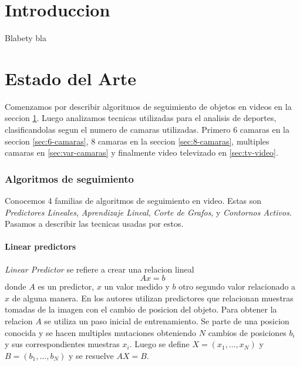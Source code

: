\documentclass[a4paper,10pt]{article}
\title{}
\date{20 de Septiembre de 2013}
\author{Civile, Juan Pablo \and Crespo, Álvaro \and Ordano, Esteban }
\begin{document}
\pagestyle{fancy}
\maketitle
\thispagestyle{fancy}

\begin{customabstract}
\textbf{
}
\end{customabstract}

\begin{keywords}
\end{keywords}

\newpage

\part*{Introduccion}

Blabety bla

\newpage

\part*{Estado del Arte}

Comenzamos por describir algoritmos de seguimiento de objetos en videos en la seccion \ref{sec:tracking}.
Luego analizamos tecnicas utilizadas para el analisis de deportes, clasificandolas segun el numero de camaras utilizadas.
Primero 6 camaras en la seccion \ref{sec:6-camaras}, 8 camaras en la seccion \ref{sec:8-camaras}, multiples camaras en \ref{sec:var-camaras} y finalmente video televizado en \ref{sec:tv-video}.

\section{Algoritmos de seguimiento}
\label{sec:tracking}

Conocemos 4 familias de algoritmos de seguimiento en video.
Estas son \textit{Predictores Lineales}, \textit{Aprendizaje Lineal}, \textit{Corte de Grafos}, y \textit{Contornos Activos}.
Pasamos a describir las tecnicas usadas por estos.

\subsection{Linear predictors}

\textit{Linear Predictor} se refiere a crear una relacion lineal \[ Ax = b \] donde $A$ es un predictor, $x$ un valor medido y $b$ otro segundo valor relacionado a $x$ de alguna manera.
En \cite{alp, original-linear-predictors} los autores utilizan predictores que relacionan muestras tomadas de la imagen con el cambio de posicion del objeto.
Para obtener la relacion $A$ se utiliza un paso inicial de entrenamiento.
Se parte de una posicion conocida y se hacen multiples mutaciones obteniendo $N$ cambios de posiciones $b_i$ y sus correspondientes muestras $x_i$.
Luego se define $X = (x_1, \dots, x_N)$ y $B = (b_1, \dots, b_N)$ y se resuelve $AX = B$.
\end{document}

